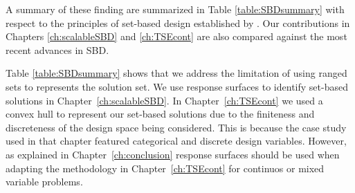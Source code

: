 A summary of these finding are summarized in Table \ref{table:SBDsummary} with respect to the principles of set-based design established by \citeauthor{SobekIi1999} \cite{SobekIi1999}. Our contributions in Chapters \ref{ch:scalableSBD} and \ref{ch:TSEcont} are also compared against the most recent advances in \ac{SBD}.

Table \ref{table:SBDsummary} shows that we address the limitation of using ranged sets to represents the solution set. We use response surfaces to identify set-based solutions in Chapter~\ref{ch:scalableSBD}. In Chapter~\ref{ch:TSEcont} we used a convex hull to represent our set-based solutions due to the finiteness and discreteness of the design space being considered. This is because the case study used in that chapter featured categorical and discrete design variables. However, as explained in Chapter~\ref{ch:conclusion} response surfaces should be used when adapting the methodology in Chapter~\ref{ch:TSEcont} for continuos or mixed variable problems.

\renewcommand{\changeCW}{0.55cm}
\renewcommand{\mycontCW}{1.2cm}

